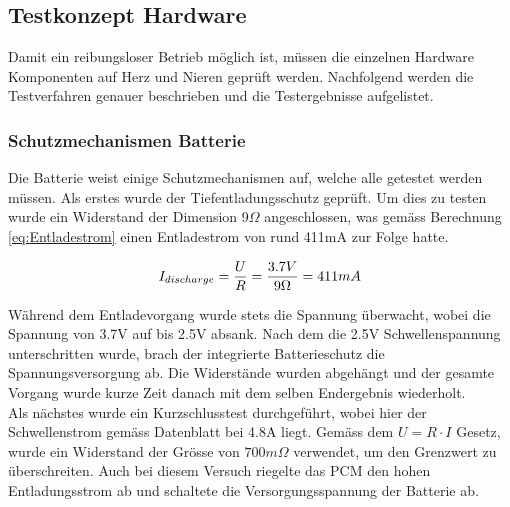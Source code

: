 \subsection{Testkonzept Hardware}\label{sec:testkonzeptHardware}
Damit ein reibungsloser Betrieb möglich ist, müssen die einzelnen Hardware Komponenten auf Herz und Nieren geprüft werden. Nachfolgend werden die Testverfahren genauer beschrieben und die Testergebnisse aufgelistet.

\subsubsection*{Schutzmechanismen Batterie}\label{sec:batterie}
Die Batterie weist einige Schutzmechanismen auf, welche alle getestet werden müssen. Als erstes wurde der Tiefentladungsschutz geprüft. Um dies zu testen wurde ein Widerstand der Dimension 9$\Omega$ angeschlossen, was gemäss Berechnung \ref{eq:Entladestrom} einen Entladestrom von rund 411mA zur Folge hatte.

\begin{equation}
\centering
I_{discharge}=\frac{U}{R}=\frac{3.7V}{9\Omega }= 411mA
\label{eq:Entladestrom}
\end{equation}

Während dem Entladevorgang wurde stets die Spannung überwacht, wobei die Spannung von 3.7V auf bis 2.5V absank. Nach dem die 2.5V Schwellenspannung unterschritten wurde, brach der integrierte Batterieschutz die Spannungsversorgung ab. Die Widerstände wurden abgehängt und der gesamte Vorgang wurde kurze Zeit danach mit dem selben Endergebnis wiederholt.
\\
Als nächstes wurde ein Kurzschlusstest durchgeführt, wobei hier der Schwellenstrom gemäss Datenblatt bei 4.8A liegt. Gemäss dem $U=R\cdot I$ Gesetz, wurde ein Widerstand der Grösse von $700m\Omega$ verwendet, um den Grenzwert zu überschreiten. Auch bei diesem Versuch riegelte das PCM den hohen Entladungsstrom ab und schaltete die Versorgungsspannung der Batterie ab.

